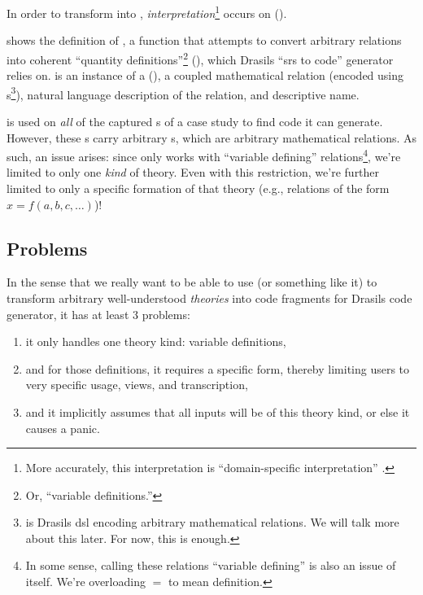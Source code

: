 In order to transform  into
, \textit{interpretation}\footnote{More
    accurately, this interpretation is ``domain-specific interpretation''
    \cite{Czarnecki2005}.} occurs on 
().

\originalRelToQDHaskell{}

 shows the definition of \relToQD{}, a function that
attempts to convert arbitrary relations into coherent ``quantity
definitions''\footnote{Or, ``variable definitions.''} (\QDefinition{}), which
Drasils ``\acs{srs} to code'' generator relies on.  is an
instance of a \RelationConcept{} (), a coupled
mathematical relation (encoded using \Relation{}s\footnote{\Relation{} is
    Drasils \acs{dsl} encoding arbitrary mathematical relations. We will talk more
    about this later. For now, this is enough.}), natural language description of
the relation, and descriptive name.

\originalRelationConcept{}

\relToQD{} is used on \textit{all} of the captured \InstanceModel{}s of a case
study to find code it can generate. However, these \InstanceModel{}s carry
arbitrary \Relation{}s, which are arbitrary mathematical relations. As such, an
issue arises: since \relToQD{} only works with ``variable defining''
relations\footnote{In some sense, calling these relations ``variable defining''
    is also an issue of itself. We're overloading \(=\) to mean definition.}, we're
limited to only one \textit{kind} of theory. Even with this restriction, we're
further limited to only a specific formation of that theory (e.g., relations of
the form \(x = f(a, b, c, \ldots{})\))!

\subsection{Problems}
\label{chap:modelkinds:sec:transforming-theories-to-code:subsec:problems}

In the sense that we really want to be able to use \relToQD{} (or something like
it) to transform arbitrary well-understood \textit{theories} into code fragments
for Drasils code generator, it has at least 3 problems:
\begin{enumerate}
    \item[\namedlabel{mk:issue:1}{P1}] it only handles one theory kind:
        variable definitions,
    \item[\namedlabel{mk:issue:2}{P2}] and for those definitions, it requires a
        specific form, thereby limiting users to very specific usage, views, and
        transcription,
    \item[\namedlabel{mk:issue:3}{P3}] and it implicitly assumes that all inputs
        will be of this theory kind, or else it causes a panic.
\end{enumerate}

